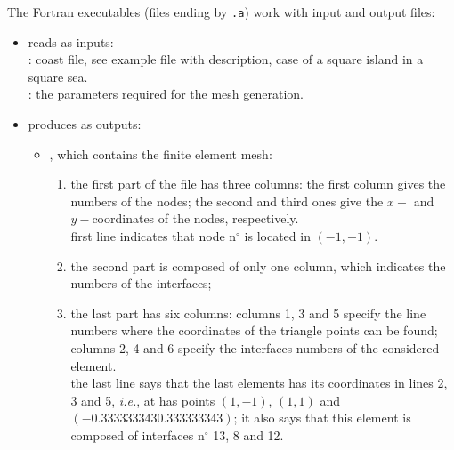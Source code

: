 The Fortran executables (files ending by \texttt{.a}) work with input and output  files:


\begin{itemize}

  \item   reads as inputs:			\\
  	:			coast file, see example file with description, case of a square island in a square sea.	\\				
	:			the parameters required for the mesh generation.					
	\item 	produces as outputs:	\\							

\begin{itemize}

\item {}, which contains the finite element mesh: 
\begin{enumerate}

\item the first part of the file has three columns: the first column gives the numbers of the nodes; the second and third ones give the $x-$ and $y-$coordinates of the nodes, respectively. \\
\example first line indicates that node n$^{\circ}$ is located in $(-1,-1)$.
\item the second part is composed of only one column, which indicates the numbers of the interfaces;
\item the last part has six columns: columns 1, 3 and 5 specify the line numbers where the coordinates of the triangle points can be found; columns 2, 4 and 6 specify the interfaces numbers of the considered element.\\
\example the last line says that the last elements has its coordinates in lines 2, 3 and 5, \textit{i.e.}, at has points $(1,-1)$, $(1,1)$ and $(-0.333333343  0.333333343)$; it also says that this element is composed of interfaces n$^{\circ}$ 13, 8 and 12.

\end{enumerate}




\end{itemize}
\end{itemize}
